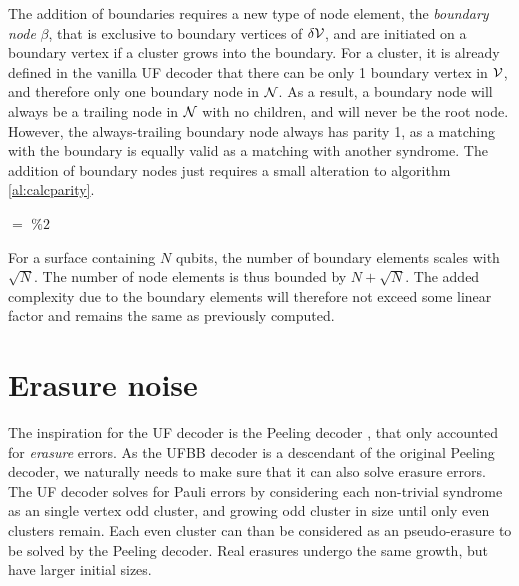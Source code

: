 The addition of boundaries requires a new type of node element, the \emph{boundary node} $\beta$, that is exclusive to boundary vertices of $\delta\mathcal{V}$, and are initiated on a boundary vertex if a cluster grows into the boundary. For a cluster, it is already defined in the vanilla UF decoder that there can be only 1 boundary vertex in $\mathcal{V}$, and therefore only one boundary node in $\mathcal{N}$. As a result, a boundary node will always be a trailing node in $\mathcal{N}$ with no children, and will never be the root node. However, the always-trailing boundary node  always has parity 1, as a matching with the boundary is equally valid as a matching with another syndrome. The addition of boundary nodes just requires a small alteration to algorithm \ref{al:calcparity}.

\begin{algo}[algotitle=CalcParity for surfaces with boundaries, label=al:calcparity2]
\begin{algorithm}[H]

\KwData{\node}

\BlankLine

\parity $=$  $\%2$\;
\end{algorithm}
\end{algo}

For a surface containing $N$ qubits, the number of boundary elements scales with $\sqrt{N}$. The number of node elements is thus bounded by $N + \sqrt{N}$. The added complexity due to the boundary elements will therefore not exceed some linear factor and remains the same as previously computed.


\section{Erasure noise}

The inspiration for the UF decoder is the Peeling decoder \cite{delfosse2017linear}, that only accounted for \emph{erasure} errors. As the UFBB decoder is a descendant of the original Peeling decoder, we naturally needs to make sure that it can also solve erasure errors. The UF decoder solves for Pauli errors by considering each non-trivial syndrome as an single vertex odd cluster, and growing odd cluster in size until only even clusters remain. Each even cluster can than be considered as an pseudo-erasure to be solved by the Peeling decoder. Real erasures undergo the same growth, but have larger initial sizes.

